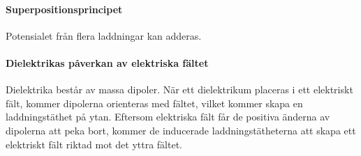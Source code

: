 \paragraph{Superpositionsprincipet}
Potensialet från flera laddningar kan adderas.

\paragraph{Dielektrikas påverkan av elektriska fältet}
Dielektrika består av massa dipoler. När ett dielektrikum placeras i ett elektriskt fält, kommer dipolerna orienteras med fältet, vilket kommer skapa en laddningstäthet på ytan. Eftersom elektriska fält får de positiva änderna av dipolerna att peka bort, kommer de inducerade laddningstätheterna att skapa ett elektriskt fält riktad mot det yttra fältet.